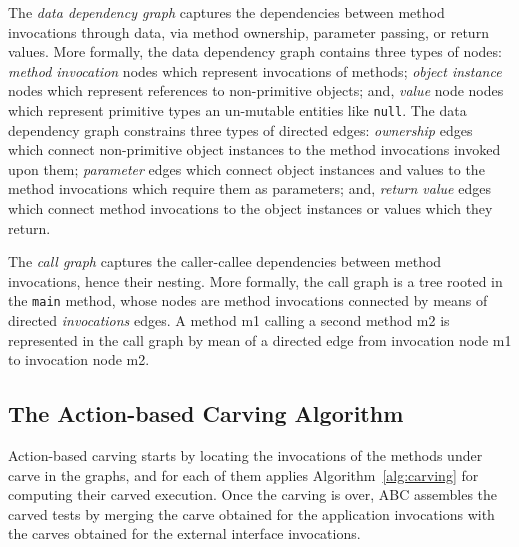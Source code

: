 \documentclass[10pt,conference]{IEEEtran}
\newcommand{\abc}{\textsf{ABC}\xspace}
\begin{document}
The \emph{data dependency graph} captures the dependencies between method invocations through data, via method ownership, parameter passing, or return values.
%
More formally, the data dependency graph contains three types of nodes:
	\emph{method invocation} nodes which represent invocations of methods;
	\emph{object instance} nodes which represent references to non-primitive objects;
	and, \emph{value} node nodes which represent primitive types an un-mutable entities like \texttt{null}.
The data dependency graph constrains three types of directed edges:
	\emph{ownership} edges which connect non-primitive object instances to the method invocations invoked upon them;
	\emph{parameter} edges which connect object instances and values to the method invocations which require them as parameters;
	and, \emph{return value} edges which connect method invocations to the object instances or values which they return. 

The \emph{call graph} captures the caller-callee dependencies between method invocations, hence their nesting.
More formally, the call graph is a tree rooted in the \texttt{main} method, whose nodes are method invocations connected by means of directed \emph{invocations} edges. A method m1 calling a second method m2 is represented in the call graph by mean of a directed edge from invocation node m1 to invocation node m2.

\subsection{The Action-based Carving Algorithm}
Action-based carving starts by locating the invocations of
the methods under carve  in the graphs, and for each of them applies
Algorithm~\ref{alg:carving} for computing their carved execution.
%
Once the carving is over, \abc assembles the carved tests by merging
the carve obtained for the application invocations with the carves obtained for
the external interface invocations.
\end{document}
